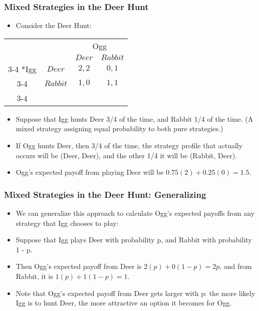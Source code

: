 \begin{frame}
\frametitle{Mixed Strategies in the Deer Hunt}
\begin{itemize}
	\item Consider the Deer Hunt:
\end{itemize}
\begin{table}[h]
\centering
\begin{tabular}{cc|c|c|}
	& \multicolumn{1}{c}{} & \multicolumn{2}{c}{Ogg}\\
	& \multicolumn{1}{c}{} & \multicolumn{1}{c}{$Deer$}  & \multicolumn{1}{c}{$Rabbit$} \\\cline{3-4}
	\multirow{2}*{Igg}  & $Deer$ & $2, 2$ & $0, 1$ \\\cline{3-4}
	& $Rabbit$ & $1, 0$ & $1, 1$ \\\cline{3-4}
\end{tabular}
\end{table}
\begin{itemize}
	\item Suppose that Igg hunts Deer 3/4 of the time, and Rabbit 1/4 of the time. (A mixed strategy assigning equal probability to both pure strategies.)
	\item If Ogg hunts Deer, then 3/4 of the time, the strategy profile that actually occurs will be (Deer, Deer), and the other 1/4 it will be (Rabbit, Deer).
	\item Ogg's expected payoff from playing Deer will be $0.75(2) + 0.25(0) = 1.5$.
\end{itemize}
\end{frame}

\begin{frame}
\frametitle{Mixed Strategies in the Deer Hunt: Generalizing}
\begin{itemize}
	\item We can generalize this approach to calculate Ogg's expected payoffs from any strategy that Igg chooses to play:
	\item Suppose that Igg plays Deer with probability p, and Rabbit with probability 1 - p.
	\item Then Ogg's expected payoff from Deer is $2(p) + 0(1 - p) = 2p$, and from Rabbit, it is $1(p) + 1(1 - p) = 1$.
	\item Note that Ogg's expected payoff from Deer gets larger with p: the more likely Igg is to hunt Deer, the more attractive an option it becomes for Ogg.
\end{itemize}
\end{frame}

